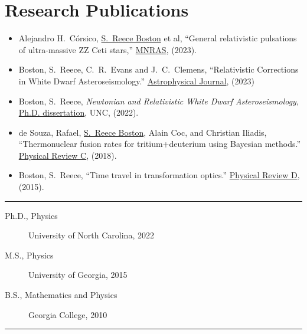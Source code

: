\documentclass[11pt, letter]{article}
\begin{document}
\section*{Research Publications}
\begin{minipage}{\textwidth}
%
\begin{itemize}
		\item Alejandro H.~C\'orsico, \underline{S.~Reece Boston} et al, 
			``General relativistic pulsations of ultra-massive ZZ Ceti stars,'' 
			\href{https://doi.org/10.1093/mnras/stad2248}{MNRAS}, 
			(2023).
		\item Boston, S.~Reece, C.~R.~Evans and J.~C.~Clemens, 
			``Relativistic Corrections in White Dwarf Asteroseismology.'' 
			\href{https://iopscience.iop.org/article/10.3847/1538-4357/acd446}{Astrophysical Journal}, (2023)
		\item Boston, S.~Reece, 
			\emph{Newtonian and Relativistic White Dwarf Asteroseismology}, 
			\\\href{https://cdr.lib.unc.edu/concern/dissertations/jw827n44n?locale=en}{Ph.D. dissertation}, 
			UNC, (2022).
		\item de Souza, Rafael, \underline{S.~Reece Boston}, Alain Coc, and Christian Iliadis, 
			``Thermonuclear fusion rates for tritium+deuterium using Bayesian methods.''  
			\href{http://journals.aps.org/prc/abstract/10.1103/PhysRevC.99.014619}{Physical Review C}, 
			(2018).
		\item Boston, S.~Reece, 
			``Time travel in transformation optics.''  
			\href{http://journals.aps.org/prd/abstract/10.1103/PhysRevD.91.124035}{Physical Review D}, 
			(2015).
\end{itemize}

\hrule
\end{minipage}
\begin{description}
		\item[Ph.D., Physics] University of North Carolina, 2022
		\item[M.S., Physics] University of Georgia, 2015
		\item[B.S., Mathematics and Physics] Georgia College, 2010
\end{description}
\hrule

\vfill
\mbox{}
\end{document}

